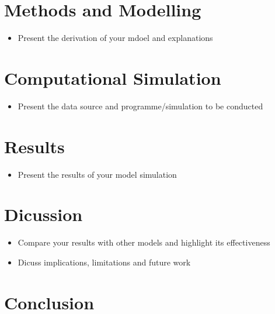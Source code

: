\documentclass[conference]{IEEEtran}
\begin{document}
\section{Methods and Modelling}
\begin{itemize}
\item Present the derivation of your mdoel and explanations
\end{itemize}
\section{Computational Simulation}
\begin{itemize}
\item Present the data source and programme/simulation to be conducted
\end{itemize}
\section{Results}
\begin{itemize}
\item Present the results of your model simulation
\end{itemize}
\section{Dicussion}
\begin{itemize}
\item Compare your results with other models and highlight its effectiveness
\item Dicuss implications, limitations and future work
\end{itemize}
\section{Conclusion}


\end{document}
